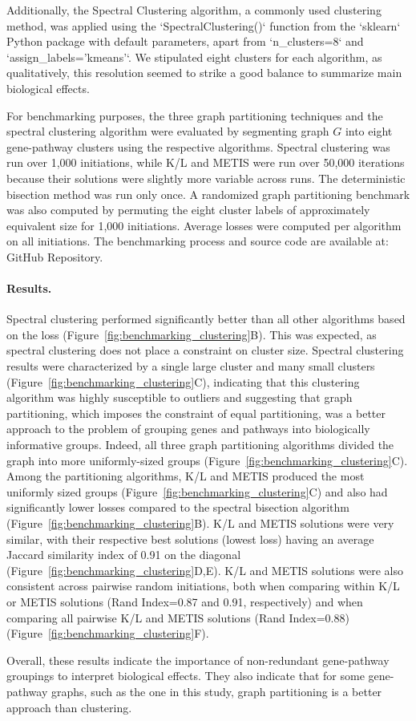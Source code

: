 Additionally, the Spectral Clustering algorithm, a commonly used clustering method, was applied using the `SpectralClustering()` function from the `sklearn` Python package with default parameters, apart from `n\_clusters=8` and `assign\_labels='kmeans'`. We stipulated eight clusters for each algorithm, as qualitatively, this resolution seemed to strike a good balance to summarize main biological effects.

For benchmarking purposes, the three graph partitioning techniques and the spectral clustering algorithm were evaluated by segmenting graph $G$ into eight gene-pathway clusters using the respective algorithms. Spectral clustering was run over 1,000 initiations, while K/L and METIS were run over 50,000 iterations because their solutions were slightly more variable across runs. The deterministic bisection method was run only once. A randomized graph partitioning benchmark was also computed by permuting the eight cluster labels of approximately equivalent size for 1,000 initiations. Average losses were computed per algorithm on all initiations. The benchmarking process and source code are available at: GitHub Repository.

\paragraph{Results.}
Spectral clustering performed significantly better than all other algorithms based on the loss (Figure~\ref{fig:benchmarking_clustering}B). This was expected, as spectral clustering does not place a constraint on cluster size. Spectral clustering results were characterized by a single large cluster and many small clusters (Figure~\ref{fig:benchmarking_clustering}C), indicating that this clustering algorithm was highly susceptible to outliers and suggesting that graph partitioning, which imposes the constraint of equal partitioning, was a better approach to the problem of grouping genes and pathways into biologically informative groups. Indeed, all three graph partitioning algorithms divided the graph into more uniformly-sized groups (Figure~\ref{fig:benchmarking_clustering}C). Among the partitioning algorithms, K/L and METIS produced the most uniformly sized groups (Figure~\ref{fig:benchmarking_clustering}C) and also had significantly lower losses compared to the spectral bisection algorithm (Figure~\ref{fig:benchmarking_clustering}B). K/L and METIS solutions were very similar, with their respective best solutions (lowest loss) having an average Jaccard similarity index of 0.91 on the diagonal (Figure~\ref{fig:benchmarking_clustering}D,E). K/L and METIS solutions were also consistent across pairwise random initiations, both when comparing within K/L or METIS solutions (Rand Index=0.87 and 0.91, respectively) and when comparing all pairwise K/L and METIS solutions (Rand Index=0.88) (Figure~\ref{fig:benchmarking_clustering}F).

Overall, these results indicate the importance of non-redundant gene-pathway groupings to interpret biological effects. They also indicate that for some gene-pathway graphs, such as the one in this study, graph partitioning is a better approach than clustering.
